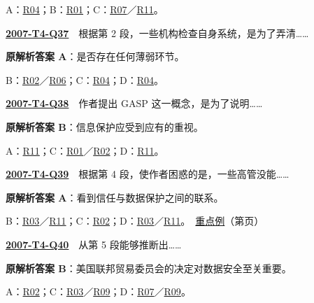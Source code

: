 \documentclass[11pt,a4paper]{article}
\begin{document}
\noindent A：\hyperref[cat-R04]{R04}；B：\hyperref[cat-R01]{R01}；C：\hyperref[cat-R07]{R07}／\hyperref[cat-R11]{R11}。\par\smallskip
{}\label{idx-2007-T4-Q37}\noindent\textbf{\href{https://zj139.github.io/math-notes/english/4583f11cfad63caee815e722/\#q37}{2007-T4-Q37}}　根据第 2 段，一些机构检查自身系统，是为了弄清……\par\nopagebreak
\noindent\textbf{原解析答案 A}：是否存在任何薄弱环节。\par\nopagebreak
\noindent B：\hyperref[cat-R02]{R02}／\hyperref[cat-R06]{R06}；C：\hyperref[cat-R04]{R04}；D：\hyperref[cat-R04]{R04}。\par\smallskip
{}\label{idx-2007-T4-Q38}\noindent\textbf{\href{https://zj139.github.io/math-notes/english/4583f11cfad63caee815e722/\#q38}{2007-T4-Q38}}　作者提出 GASP 这一概念，是为了说明……\par\nopagebreak
\noindent\textbf{原解析答案 B}：信息保护应受到应有的重视。\par\nopagebreak
\noindent A：\hyperref[cat-R11]{R11}；C：\hyperref[cat-R01]{R01}／\hyperref[cat-R02]{R02}；D：\hyperref[cat-R11]{R11}。\par\smallskip
{}\label{idx-2007-T4-Q39}\noindent\textbf{\href{https://zj139.github.io/math-notes/english/4583f11cfad63caee815e722/\#q39}{2007-T4-Q39}}　根据第 4 段，使作者困惑的是，一些高管没能……\par\nopagebreak
\noindent\textbf{原解析答案 A}：看到信任与数据保护之间的联系。\par\nopagebreak
\noindent B：\hyperref[cat-R03]{R03}／\hyperref[cat-R11]{R11}；C：\hyperref[cat-R02]{R02}；D：\hyperref[cat-R03]{R03}／\hyperref[cat-R11]{R11}。　\hyperref[case-2007-T4-Q39]{重点例}（第\pageref{case-2007-T4-Q39}页）\par\smallskip
{}\label{idx-2007-T4-Q40}\noindent\textbf{\href{https://zj139.github.io/math-notes/english/4583f11cfad63caee815e722/\#q40}{2007-T4-Q40}}　从第 5 段能够推断出……\par\nopagebreak
\noindent\textbf{原解析答案 B}：美国联邦贸易委员会的决定对数据安全至关重要。\par\nopagebreak
\noindent A：\hyperref[cat-R02]{R02}；C：\hyperref[cat-R03]{R03}／\hyperref[cat-R09]{R09}；D：\hyperref[cat-R07]{R07}／\hyperref[cat-R09]{R09}。\par\smallskip
\clearpage
\end{document}
